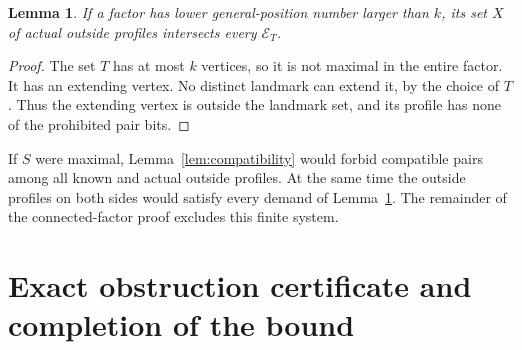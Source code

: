 \documentclass[11pt]{article}
\newtheorem{lemma}[theorem]{Lemma}
\theoremstyle{definition}
\theoremstyle{remark}
\begin{document}
\begin{lemma}\label{lem:demands}
If a factor has lower general-position number larger than $k$, its set
$X$ of actual outside profiles intersects every $\mathcal E_T$.
\end{lemma}
\begin{proof}
The set $T$ has at most $k$ vertices, so it is not maximal in the entire
factor. It has an extending vertex. No distinct landmark can extend it,
by the choice of $T$. Thus the extending vertex is outside the landmark
set, and its profile has none of the prohibited pair bits.
\end{proof}

If $S$ were maximal, Lemma~\ref{lem:compatibility} would forbid compatible
pairs among all known and actual outside profiles. At the same time the
outside profiles on both sides would satisfy every demand of
Lemma~\ref{lem:demands}. The remainder of the connected-factor proof
excludes this finite system.

\section{Exact obstruction certificate and completion of the bound}
\label{sec:certificate}
\end{document}
